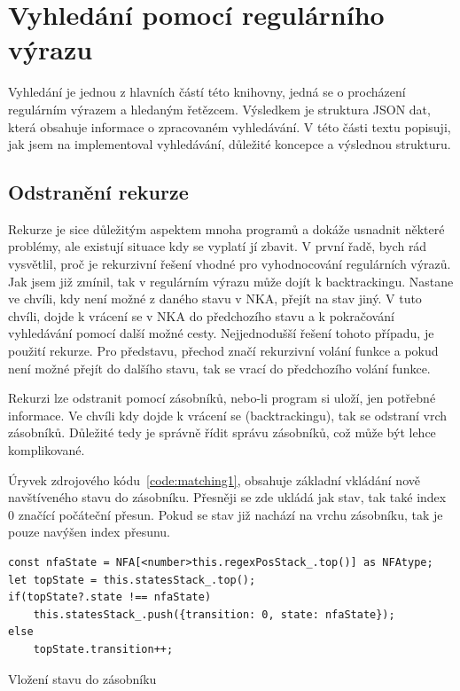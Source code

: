 \newpage

\section{Vyhledání pomocí regulárního výrazu}\label{sec:PatternMatching}

Vyhledání je jednou z hlavních částí této knihovny, jedná se o procházení regulárním výrazem a hledaným řetězcem.
Výsledkem je struktura JSON dat, která obsahuje informace o zpracovaném vyhledávání.
V této části textu popisuji, jak jsem na implementoval vyhledávání, důležité koncepce a výslednou strukturu.

\subsection*{Odstranění rekurze}

Rekurze je sice důležitým aspektem mnoha programů a dokáže usnadnit některé problémy, ale existují situace kdy se vyplatí jí zbavit.
V první řadě, bych rád vysvětlil, proč je rekurzivní řešení vhodné pro vyhodnocování regulárních výrazů.
Jak jsem již zmínil, tak v regulárním výrazu může dojít k backtrackingu.
Nastane ve chvíli, kdy není možné z daného stavu v NKA, přejít na stav jiný.
V tuto chvíli, dojde k vrácení se v NKA do předchozího stavu a k pokračování vyhledávání pomocí další možné cesty.
Nejjednodušší řešení tohoto případu, je použití rekurze.
Pro představu, přechod značí rekurzivní volání funkce a pokud není možné přejít do dalšího stavu, tak se vrací do předchozího volání funkce.

Rekurzi lze odstranit pomocí zásobníků, nebo-li program si uloží, jen potřebné informace.
Ve chvíli kdy dojde k vrácení se (backtrackingu), tak se odstraní vrch zásobníků.
Důležité tedy je správně řídit správu zásobníků, což může být lehce komplikované.

Úryvek zdrojového kódu~\ref{code:matching1}, obsahuje základní vkládání nově navštíveného stavu do zásobníku.
Přesněji se zde ukládá jak stav, tak také index 0 značící počáteční přesun.
Pokud se stav již nachází na vrchu zásobníku, tak je pouze navýšen index přesunu.

\begin{code}[!ht]
	\begin{verbatim}
const nfaState = NFA[<number>this.regexPosStack_.top()] as NFAtype;
let topState = this.statesStack_.top();
if(topState?.state !== nfaState)
	this.statesStack_.push({transition: 0, state: nfaState});
else
	topState.transition++;
	\end{verbatim}
	\caption{Vložení stavu do zásobníku}
	\label{code:matching1}
\end{code}

